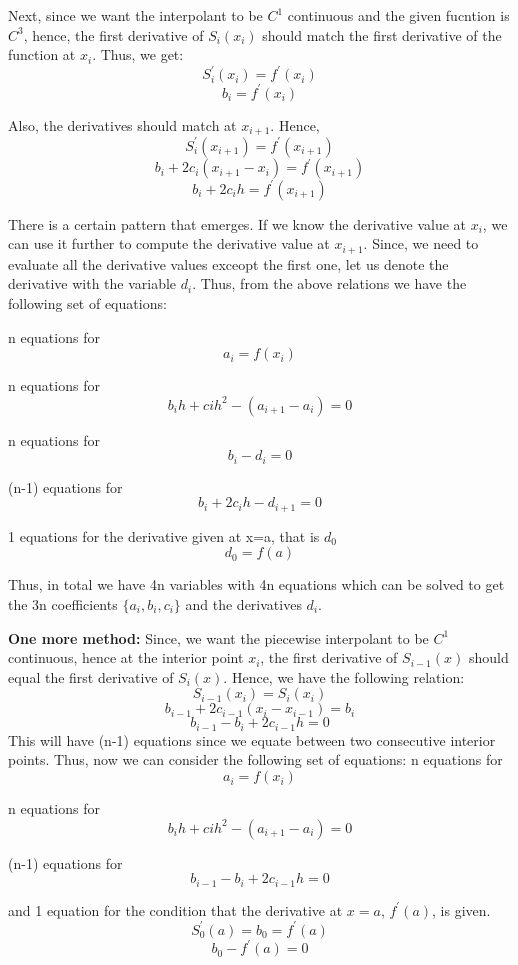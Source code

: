 \documentclass{article}
\begin{document}
Next, since we want the interpolant to be $C^1$ continuous and the given fucntion is $C^3$, hence, the first derivative of $S_i(x_i)$ should match the first derivative of the function at $x_i$. Thus, we get: 
\[ S_{i}^\prime(x_i) = f^\prime(x_i) \]
\[ b_i = f^\prime(x_i)\]

Also, the derivatives should match at $x_{i+1}$. Hence, 
\[ S_i^\prime(x_{i+1}) = f^\prime(x_{i+1})\]
\[ b_i + 2c_i(x_{i+1} - x_i) = f^\prime(x_{i+1})\]
\[ b_i + 2c_i h = f^\prime(x_{i+1})\]

There is a certain pattern that emerges. If we know the derivative value at $x_i$, we can use it further to compute the derivative value at $x_{i+1}$. Since, we need to evaluate all the derivative values exceopt the first one, let us denote the derivative with the variable $d_i$. \newline
Thus, from the above relations we have the following set of equations:

n equations for
\[ a_i = f(x_i)\]

n equations for
\[ b_i h + ci h^2 - (a_{i+1} - a_i) = 0\]

n equations for 
\[ b_i - d_i = 0\]

(n-1) equations for 
\[ b_i + 2c_i h - d_{i+1} = 0 \]

1 equations for the derivative given at x=a, that is $d_0$
\[ d_0 = f(a)\]

Thus, in total we have 4n variables with 4n equations which can be solved to get the 3n coefficients $\{a_i, b_i, c_i\}$ and the derivatives $d_i$. \newline

\textbf{One more method:} Since, we want the piecewise interpolant to be $C^1$ continuous, hence at the interior point $x_i$, the first derivative of $S_{i-1}(x)$ should equal the first derivative of $S_i(x)$. Hence, we have the following relation:
\[ S_{i-1}(x_i) = S_i(x_i)\]
\[ b_{i-1} + 2c_{i-1}(x_i - x_{i-1}) = b_i\]
\[ b_{i-1} - b_i + 2c_{i-1} h = 0\]
This will have (n-1) equations since we equate between two consecutive interior points. \newline
Thus, now we can consider the following set of equations: \newline
n equations for
\[ a_i = f(x_i)\]

n equations for
\[ b_i h + ci h^2 - (a_{i+1} - a_i) = 0\]

(n-1) equations for 
\[ b_{i-1} - b_i + 2c_{i-1} h = 0\]

and 1 equation for the condition that the derivative at $x=a$, $f^\prime(a)$, is given.
\[S_0^\prime(a) = b_0 = f^\prime(a) \]
\[ b_0 - f^\prime(a) = 0\]
\end{document}
